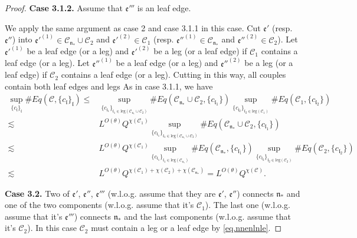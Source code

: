 \begin{proof}
\textbf{Case 3.1.2.} Assume that $\mathfrak{e}'''$ is an leaf edge. 

We apply the same argument as case 2 and case 3.1.1 in this case. Cut $\mathfrak{e}'$ (resp. $\mathfrak{e}''$) into $\mathfrak{e}'^{(1)}\in  \mathcal{C}_{\mathfrak{n}_*}\cup \mathcal{C}_2$ and $\mathfrak{e}'^{(2)}\in  \mathcal{C}_1$ (resp. $\mathfrak{e}''^{(1)}\in  \mathcal{C}_{\mathfrak{n}_*}$ and $\mathfrak{e}''^{(2)}\in  \mathcal{C}_2$). Let $\mathfrak{e}'^{(1)}$ be a leaf edge (or a leg) and $\mathfrak{e}'^{(2)}$ be a leg (or a leaf edge) if $\mathcal{C}_1$ contains a leaf edge (or a leg). Let $\mathfrak{e}''^{(1)}$ be a leaf edge (or a leg) and $\mathfrak{e}''^{(2)}$ be a leg (or a leaf edge) if $\mathcal{C}_2$ contains a leaf edge (or a leg). Cutting in this way, all couples contain both leaf edges and legs
As in case 3.1.1, we have
\begin{equation}
\begin{split}
    \sup_{\{c_{\mathfrak{l}}\}_{\mathfrak{l}}}\#Eq(\mathcal{C},\{c_{\mathfrak{l}}\}_{\mathfrak{l}})
    \le&
    \sup_{\{c_{\mathfrak{l}_1}\}_{\mathfrak{l}_1\in \text{leg}(\mathcal{C}_{\mathfrak{n}_*}\cup \mathcal{C}_2)} } \# Eq(\mathcal{C}_{\mathfrak{n}_*}\cup \mathcal{C}_2,\{c_{\mathfrak{l}_1}\}) \sup_{\{c_{\mathfrak{l}_2}\}_{\mathfrak{l}_2\in \text{leg}(\mathcal{C}_1)} }\# Eq(\mathcal{C}_{1}, \{c_{\mathfrak{l}_2}\})
    \\
    \lesssim&  L^{O(\theta)} Q^{\chi(\mathcal{C}_1)}\sup_{\{c_{\mathfrak{l}_1}\}_{\mathfrak{l}_1\in \text{leg}(\mathcal{C}_{\mathfrak{n}_*}\cup \mathcal{C}_2)} } \# Eq(\mathcal{C}_{\mathfrak{n}_*}\cup \mathcal{C}_2,\{c_{\mathfrak{l}_1}\})
    \\
    \lesssim&  L^{O(\theta)} Q^{\chi(\mathcal{C}_1)} \sup_{\{c_{\mathfrak{l}_1}\}_{\mathfrak{l}_1\in \text{leg}(\mathcal{C}_{\mathfrak{n}_*})} } \# Eq(\mathcal{C}_{\mathfrak{n}_*},\{c_{\mathfrak{l}_1}\}) \sup_{\{c_{\mathfrak{l}_2}\}_{\mathfrak{l}_2\in \text{leg}(\mathcal{C}_2)} }\# Eq(\mathcal{C}_{2}, \{c_{\mathfrak{l}_2}\})
    \\
    \lesssim&  L^{O(\theta)} Q^{\chi(\mathcal{C}_1)+\chi(\mathcal{C}_2)+\chi(\mathcal{C}_{\mathfrak{n}_*})}=L^{O(\theta)} Q^{\chi(\mathcal{C})}.
\end{split}
\end{equation}

\textbf{Case 3.2.} Two of  $\mathfrak{e}'$, $\mathfrak{e}''$, $\mathfrak{e}'''$ (w.l.o.g. assume that they are $\mathfrak{e}'$, $\mathfrak{e}''$) connects $\mathfrak{n}_*$ and one of the two components (w.l.o.g. assume that it's $\mathcal{C}_1$). The last one (w.l.o.g. assume that it's $\mathfrak{e}'''$) connects $\mathfrak{n}_*$ and the last components (w.l.o.g. assume that it's $\mathcal{C}_2$). In this case $\mathcal{C}_2$ must contain a leg or a leaf edge by \eqref{eq.nnenlnle}.


\end{proof}
